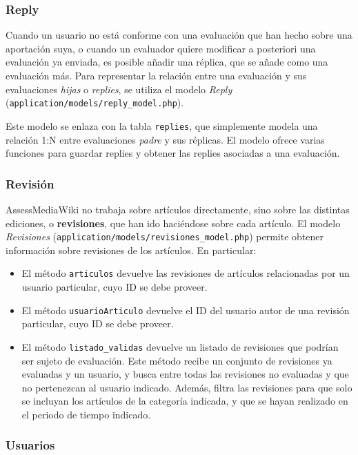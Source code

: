 \documentclass[11pt]{article}
\begin{document}
\subsubsection{Reply}

Cuando un usuario no está conforme con una evaluación que han hecho sobre una
aportación suya, o cuando un evaluador quiere modificar a posteriori una
evaluación ya enviada, es posible añadir una réplica, que se añade como una
evaluación más. Para representar la relación entre una evaluación y sus
evaluaciones \textit{hijas} o \textit{replies}, se utiliza el modelo
\textit{Reply} (\texttt{application/models/reply\_model.php}).

Este modelo se enlaza con la tabla \texttt{replies}, que simplemente modela una
relación 1:N entre evaluaciones \textit{padre} y sus réplicas. El modelo ofrece
varias funciones para guardar replies y obtener las replies asociadas a una
evaluación.

\subsubsection{Revisión}

AssessMediaWiki no trabaja sobre artículos directamente, sino sobre las
distintas ediciones, o \textbf{revisiones}, que han ido haciéndose sobre cada
artículo. El modelo \textit{Revisiones}
(\texttt{application/models/revisiones\_model.php}) permite obtener información
sobre revisiones de los artículos. En particular:
\begin{itemize}
\item El método \texttt{articulos} devuelve las revisiones de artículos
  relacionadas por un usuario particular, cuyo ID se debe proveer.
\item El método \texttt{usuarioArticulo} devuelve el ID del usuario autor de una
  revisión particular, cuyo ID se debe proveer.
\item El método \texttt{listado\_validas} devuelve un listado de revisiones que
  podrían ser sujeto de evaluación. Este método recibe un conjunto de revisiones
  ya evaluadas y un usuario, y busca entre todas las revisiones no evaluadas y
  que no pertenezcan al usuario indicado. Además, filtra las revisiones para que
  solo se incluyan los artículos de la categoría indicada, y que se hayan
  realizado en el periodo de tiempo indicado.
\end{itemize}

\subsubsection{Usuarios}
\end{document}
